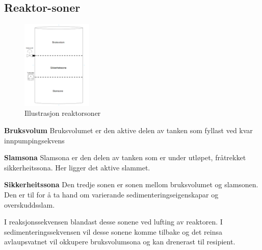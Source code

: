 \subsection{Reaktor-soner}

\begin{figure}[htbp]
    \centering
    \includegraphics[width=0.3\textwidth]{Figurar/Reaktorsoner.png}
    \caption{Illustrasjon reaktorsoner}\label{fig:reaktorsoner}
\end{figure}

\textbf{Bruksvolum} \newline
Bruksvolumet er den aktive delen av tanken som fyllast ved kvar innpumpingsekvens

\textbf{Slamsona} \newline
Slamsona er den delen av tanken som er under utløpet, fråtrekket sikkerheitssona. Her ligger det aktive slammet.

\textbf{Sikkerheitssona} \newline
Den tredje sonen er sonen mellom bruksvolumet og slamsonen. Den er til for å ta hand om varierande sedimenteringseigenskapar og overskuddsslam.

I reaksjonssekvensen blandast desse sonene ved lufting av reaktoren. I sedimenteringssekvensen vil desse sonene komme tilbake og det reinsa avlaupsvatnet vil okkupere bruksvolumsona og kan drenerast til resipient.
